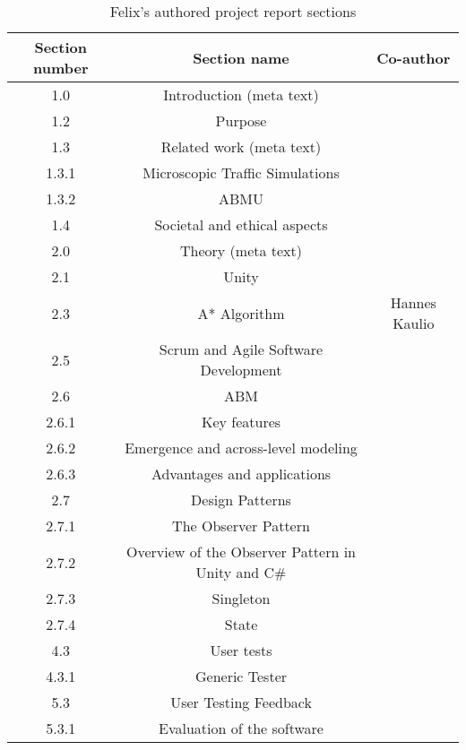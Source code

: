     \begin{table}[ht]
        \centering
            \begin{tabular}{|c|c|c|}
                \hline
                \textbf{Section number} & \textbf{Section name} & \textbf{Co-author}
                \\\hline
                
                1.0 & Introduction (meta text) & 
                \\\hline
                1.2 & Purpose &
                \\\hline
                1.3 & Related work (meta text) & 
                \\\hline
                1.3.1 & Microscopic Traffic Simulations &
                \\\hline
                1.3.2 & ABMU &
                \\\hline
                1.4 & Societal and ethical aspects &
                \\\hline
                2.0 & Theory (meta text) &
                \\\hline
                2.1 & Unity &
                \\\hline
                2.3 & A* Algorithm & Hannes Kaulio
                \\\hline
                2.5 & Scrum and Agile Software Development &
                \\\hline
                2.6 & ABM &
                \\\hline
                2.6.1 & Key features &
                \\\hline
                2.6.2 & Emergence and across-level modeling &
                \\\hline
                2.6.3 & Advantages and applications &
                \\\hline
                2.7 & Design Patterns &
                    \\\hline
                2.7.1 & The Observer Pattern &
                    \\\hline
                2.7.2 & Overview of the Observer Pattern in Unity and C\# &
                    \\\hline
                2.7.3 & Singleton &
                    \\\hline
                2.7.4 & State & 
                    \\\hline
                4.3 & User tests & 
                    \\\hline
                4.3.1 & Generic Tester & 
                    \\\hline
                5.3 & User Testing Feedback &
                    \\\hline
                5.3.1 & Evaluation of the software &
                \\\hline
            \end{tabular}
        \caption{Felix's authored project report sections}
        \label{Tab:felix-authored-sections}
    \end{table}